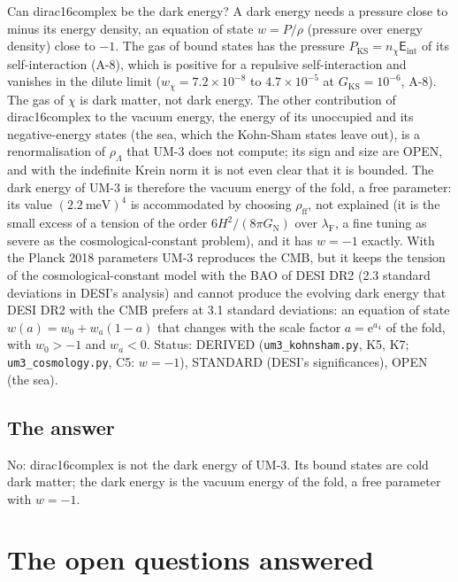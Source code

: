 \documentclass[
  10pt,
]{article}
\begin{document}
Can dirac16complex be the dark energy? A dark energy needs a pressure
close to minus its energy density, an equation of state \(w = P/\rho\)
(pressure over energy density) close to \(-1\). The gas of bound states
has the pressure \(P_{\mathrm{KS}} = n_\chi\mathsf{E}_{\mathrm{int}}\)
of its self-interaction (A-8), which is positive for a repulsive
self-interaction and vanishes in the dilute limit
(\(w_\chi = 7.2\times10^{-8}\) to \(4.7\times10^{-5}\) at
\(G_{\mathrm{KS}} = 10^{-6}\), A-8). The gas of \(\chi\) is dark matter,
not dark energy. The other contribution of dirac16complex to the vacuum
energy, the energy of its unoccupied and its negative-energy states (the
sea, which the Kohn-Sham states leave out), is a renormalisation of
\(\rho_\Lambda\) that UM-3 does not compute; its sign and size are OPEN,
and with the indefinite Krein norm it is not even clear that it is
bounded. The dark energy of UM-3 is therefore the vacuum energy of the
fold, a free parameter: its value \((2.2\ \text{meV})^4\) is
accommodated by choosing \(\rho_{\mathrm{ff}}\), not explained (it is
the small excess of a tension of the order
\(6H^2/(8\pi G_{\mathrm{N}})\) over \(\lambda_{\mathrm{F}}\), a fine
tuning as severe as the cosmological-constant problem), and it has
\(w = -1\) exactly. With the Planck 2018 parameters UM-3 reproduces the
CMB, but it keeps the tension of the cosmological-constant model with
the BAO of DESI DR2 (2.3 standard deviations in DESI's analysis) and
cannot produce the evolving dark energy that DESI DR2 with the CMB
prefers at 3.1 standard deviations: an equation of state
\(w(a) = w_0 + w_a(1 - a)\) that changes with the scale factor
\(a = \mathrm{e}^{a_4}\) of the fold, with \(w_0 > -1\) and \(w_a < 0\).
Status: DERIVED (\texttt{um3\_kohnsham.py}, K5, K7;
\texttt{um3\_cosmology.py}, C5: \(w = -1\)), STANDARD (DESI's
significances), OPEN (the sea).

\hypertarget{the-answer-2}{%
\subsection{The answer}\label{the-answer-2}}

No: dirac16complex is not the dark energy of UM-3. Its bound states are
cold dark matter; the dark energy is the vacuum energy of the fold, a
free parameter with \(w = -1\).

\hypertarget{the-open-questions-answered}{%
\section{The open questions
answered}\label{the-open-questions-answered}}
\end{document}
